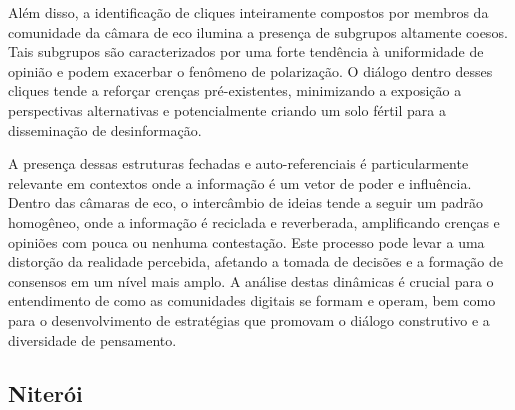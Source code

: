 Além disso, a identificação de cliques inteiramente compostos por membros da comunidade da câmara de eco ilumina a presença de subgrupos altamente coesos. Tais subgrupos são caracterizados por uma forte tendência à uniformidade de opinião e podem exacerbar o fenômeno de polarização. O diálogo dentro desses cliques tende a reforçar crenças pré-existentes, minimizando a exposição a perspectivas alternativas e potencialmente criando um solo fértil para a disseminação de desinformação.

A presença dessas estruturas fechadas e auto-referenciais é particularmente relevante em contextos onde a informação é um vetor de poder e influência. Dentro das câmaras de eco, o intercâmbio de ideias tende a seguir um padrão homogêneo, onde a informação é reciclada e reverberada, amplificando crenças e opiniões com pouca ou nenhuma contestação. Este processo pode levar a uma distorção da realidade percebida, afetando a tomada de decisões e a formação de consensos em um nível mais amplo. A análise destas dinâmicas é crucial para o entendimento de como as comunidades digitais se formam e operam, bem como para o desenvolvimento de estratégias que promovam o diálogo construtivo e a diversidade de pensamento.

\subsection{Niterói}

